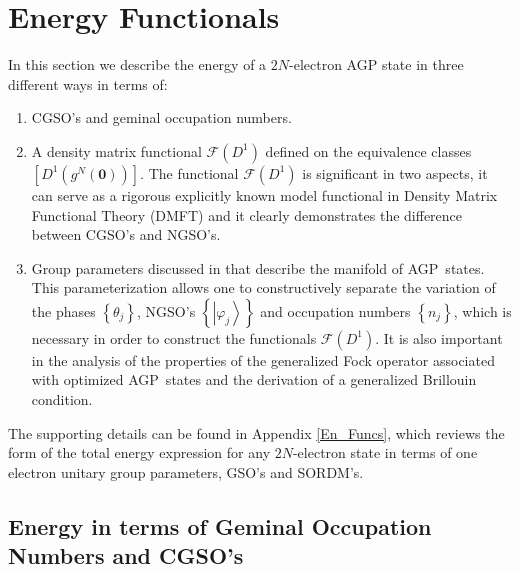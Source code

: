 \documentclass[titlepage]{article}%
\begin{document}
\section{Energy Functionals \label{Energy}}

In this section we describe the energy of a $2N$-electron AGP state in three
different ways in terms of:

\begin{enumerate}
\item CGSO's and geminal occupation numbers.

\item A density matrix functional $\mathcal{F}\left(  D^{1}\right)  $ defined
on the equivalence classes $\left[  D^{1}\left(  g^{N}\left(  \bm{0}\right)
\right)  \right]  .$ The functional $\mathcal{F}\left(  D^{1}\right)  $ is
significant in two aspects, it can serve as a rigorous explicitly known model
functional in Density Matrix Functional Theory (DMFT) \cite{Cioslowski01}%
\cite{Staroverov02}\cite{Cioslowski02} and it clearly demonstrates the
difference between CGSO's and NGSO's.

\item Group parameters discussed in \cite{AGPCoherent}that
describe the manifold of AGP\ states. This parameterization allows
one to constructively separate the variation of the phases
$\left\{  \theta_{j}\right\}  $, NGSO's $\left\{  \left\vert
\varphi_{j}\right\rangle \right\}  $ and occupation numbers
$\left\{  n_{j}\right\}  $, which is necessary in order to
construct the functionals $\mathcal{F}\left(  D^{1}\right)  $. It
is also important in the analysis of the properties of the
generalized Fock operator associated with optimized AGP\ states
and the derivation of a generalized Brillouin condition.
\end{enumerate}

The supporting details can be found in Appendix \ref{En_Funcs}, which reviews
the form of the total energy expression for any $2N$-electron state in terms
of one electron unitary group parameters, GSO's and SORDM's.

\subsection{Energy in terms of Geminal Occupation Numbers and
CGSO's\label{EnON_CGSO}}
\end{document}
